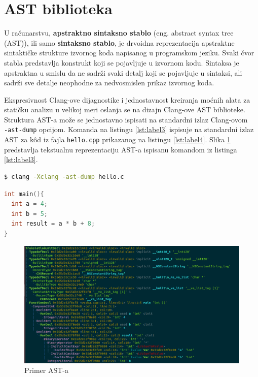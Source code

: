 \documentclass[12pt,oneside]{memoir}
\begin{document}
\section{AST biblioteka}

U računarstvu, \textbf{apstraktno sintaksno stablo} (eng. abstract syntax tree (AST)), ili samo \textbf{sintaksno stablo}, je drvoidna reprezentacija apstraktne sintaktičke strukture izvornog koda napisanog u programskom jeziku. Svaki čvor stabla predstavlja konstrukt koji se pojavljuje u izvornom kodu.
Sintaksa je apstraktna u smislu da ne sadr\v{z}i svaki detalj koji se pojavljuje u sintaksi, ali sadr\v{z}i sve detalje neophodne za nedvosmislen prikaz izvornog koda.

Ekspresivnost Clang-ove dijagnostike i jednostavnost kreiranja mo\'{c}nih alata za stati\v{c}ku analizu u velikoj meri oslanja se na dizajn Clang-ove AST biblioteke. Struktura AST-a mo\v{z}e se jednostavno ispisati na standardni izlaz Clang-ovom \\ \lstinline{-ast-dump} opcijom. Komanda na listingu \ref{lst:label3} ispisuje na standardni izlaz AST za k\^{o}d  iz fajla \lstinline{hello.cpp} prikazanog na listingu \ref{lst:label4}. Slika \ref{fig:grafikon} predstavlja tekstualnu reprezentaciju AST-a ispisanu komandom iz listinga \ref{lst:label3}.
\\


\begin{lstlisting}[caption={Komanda za ispisivanje Clang-ovog AST-a},label=lst:label3,language=bash, captionpos=b]
$ clang -Xclang -ast-dump hello.c
\end{lstlisting}

\begin{lstlisting}[caption={Kod \v{c}iji je AST prikazan na slici 4.1},label=lst:label4,language=C++, captionpos=b]
int main(){
  int a = 4;
  int b = 5;
  int result = a * b + 8;
}
\end{lstlisting}

\begin{figure}[!ht]
  \centering
  \includegraphics[width=1.0\textwidth]{ASTImage.png}
  \caption{Primer AST-a}
  \label{fig:grafikon}
\end{figure}
\end{document}
